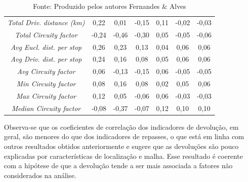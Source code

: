 \begin{spacing}{1}
\begin{table}[htb]
{\begin{tabular}{|c|ccc|ccc|}
    \textit{Total Driv. distance (km)} & \cellcolor[HTML]{C28359}0,22 & \cellcolor[HTML]{FC6765}0,01 & \cellcolor[HTML]{DA785D}-0,15 & \cellcolor[HTML]{E0745F}0,11 & \cellcolor[HTML]{FA6863}-0,02 & \cellcolor[HTML]{F76963}-0,03 \\
    \textit{Total Circuity factor} & \cellcolor[HTML]{C38358}-0,24 & \cellcolor[HTML]{8C9F4C}-0,46 & \cellcolor[HTML]{B48B55}-0,30 & \cellcolor[HTML]{F26B63}0,05 & \cellcolor[HTML]{F16C62}-0,05 & \cellcolor[HTML]{F06D61}-0,06 \\
    \textit{Avg Eucl. dist. per stop} & \cellcolor[HTML]{B68A56}0,26 & \cellcolor[HTML]{BF8558}0,23 & \cellcolor[HTML]{DC775E}0,13 & \cellcolor[HTML]{F56A63}0,04 & \cellcolor[HTML]{EE6D62}0,06 & \cellcolor[HTML]{EE6D62}0,06 \\
    \textit{Avg Driv. dist. per stop} & \cellcolor[HTML]{BD8658}0,24 & \cellcolor[HTML]{D37B5C}0,16 & \cellcolor[HTML]{EA6F61}0,08 & \cellcolor[HTML]{F26B63}0,05 & \cellcolor[HTML]{F06C62}0,06 & \cellcolor[HTML]{F06C62}0,06 \\
    \textit{Avg Circuity factor} & \cellcolor[HTML]{F06C62}0,06 & \cellcolor[HTML]{DF755E}-0,13 & \cellcolor[HTML]{D9785D}-0,15 & \cellcolor[HTML]{EF6D62}0,06 & \cellcolor[HTML]{F36B62}-0,05 & \cellcolor[HTML]{F16C62}-0,05 \\
    \textit{Min Circuity factor} & \cellcolor[HTML]{EA7061}0,08 & \cellcolor[HTML]{D47B5C}0,16 & \cellcolor[HTML]{EA6F61}0,08 & \cellcolor[HTML]{FB6765}0,02 & \cellcolor[HTML]{F06C62}0,05 & \cellcolor[HTML]{F06C62}0,06 \\
    \textit{Max Circuity factor} & \cellcolor[HTML]{DF755F}0,12 & \cellcolor[HTML]{F06C62}0,05 & \cellcolor[HTML]{EF6D61}-0,06 & \cellcolor[HTML]{F06C62}0,06 & \cellcolor[HTML]{F76963}-0,03 & \cellcolor[HTML]{F66A63}-0,03 \\
    \textit{Median Circuity factor} & \cellcolor[HTML]{EA7060}-0,08 & \cellcolor[HTML]{A39351}-0,37 & \cellcolor[HTML]{EE6E61}-0,07 & \cellcolor[HTML]{DE755E}0,12 & \cellcolor[HTML]{E37360}0,10 & \cellcolor[HTML]{E47260}0,10 \\ \hline
    \end{tabular}}
    \caption*{Fonte: Produzido pelos autores Fernandes \& Alves}
    \end{table}
\end{spacing}

Observa-se que os coeficientes de correlação dos indicadores de devolução, em geral, são menores do que dos indicadores de repasses, o que está em linha com outros resultados obtidos anteriormente e  sugere que as devoluções são pouco explicadas por características de localização e malha.
Esse resultado é coerente com a hipótese de que a devolução tende a ser mais associada a fatores não considerados na análise. %

